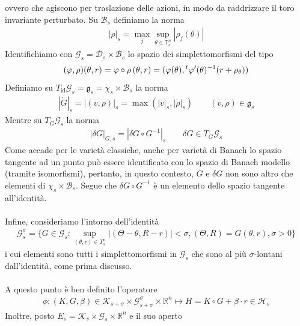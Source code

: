 \documentclass[twoside, 11pt]{amsbook}
\newcommand{\0}{{(0)}}
\newcommand{\3}{{(3)}}
\theoremstyle{colonplain}
\theoremstyle{colondefinition}
\theoremstyle{colonremark}
\numberwithin{equation}{chapter}
\begin{document}
ovvero che agiscono per traslazione delle azioni, in modo da raddrizzare il toro invariante perturbato. Su $\mathcal{B}_s$ definiamo la norma
\begin{align}
    |\rho|_s = \max_j \sup_{\theta \in \mathbb{T}^n_s} |\rho_j(\theta)|
\end{align}
Identifichiamo con $\mathcal{G}_s = \mathcal{D}_s \times \mathcal{B}_s$ lo spazio dei simplettomorfismi del tipo
\begin{align}
    (\varphi, \rho)(\theta, r) = \varphi \circ \rho \, (\theta, r) = (\varphi(\theta), \null^t\varphi'(\theta)^{-1}(r + \rho_\theta))
\end{align}
Definiamo su $T_{\mathrm{id}}\mathcal{G}_s = \mathfrak{g}_s = \chi_s \times \mathcal{B}_s$ la norma
\begin{align}
    |\dot{G}|_s = |(\dot{v}, \dot{\rho})|_s = \max(|\dot{v}|_s, |\dot{\rho}|_s) \qquad (\dot{v}, \dot{\rho}) \in \mathfrak{g}_s
\end{align}
Mentre su $T_G\mathcal{G}_s$ la norma
\begin{align}
    |\delta G|_{G, s} = |\delta G \circ G^{-1}|_s \qquad \delta G \in T_G\mathcal{G}_s
\end{align}
Come accade per le varietà classiche, anche per varietà di Banach lo spazio tangente ad un punto può essere identificato con lo spazio di Banach modello (tramite isomorfismi), pertanto, in questo contesto, $\dot{G}$ e $\delta G$ non sono altro che elementi di $\chi_s \times \mathcal{B}_s$. Segue che $\delta G \circ G^{-1}$ è un elemento dello spazio tangente all'identità. \\ \\
Infine, consideriamo l'intorno dell'identità
\begin{align}
    \mathcal{G}^\sigma_s = \{G \in \mathcal{G}_s : \sup_{(\theta, r) \in T^n_s} |(\Theta - \theta, R - r)| < \sigma, (\Theta, R) = G(\theta, r), \sigma > 0\}
\end{align}
i cui elementi sono tutti i simplettomorfismi in $\mathcal{G}_s$ che sono al più $\sigma$-lontani dall'identità, come prima discusso. \\ \\
A questo punto è ben definito l'operatore
\begin{align}
    \phi : (K, G, \beta) \in \mathcal{K}_{s + \sigma} \times \mathcal{G}^\sigma_{s + \sigma} \times \mathbb{R}^n \mapsto H = K \circ G + \beta \cdot r \in \mathcal{H}_s
\end{align}
Inoltre, posto $E_s = \mathcal{K}_s \times \mathcal{G}_s \times \mathbb{R}^n$ e il suo aperto
\end{document}
